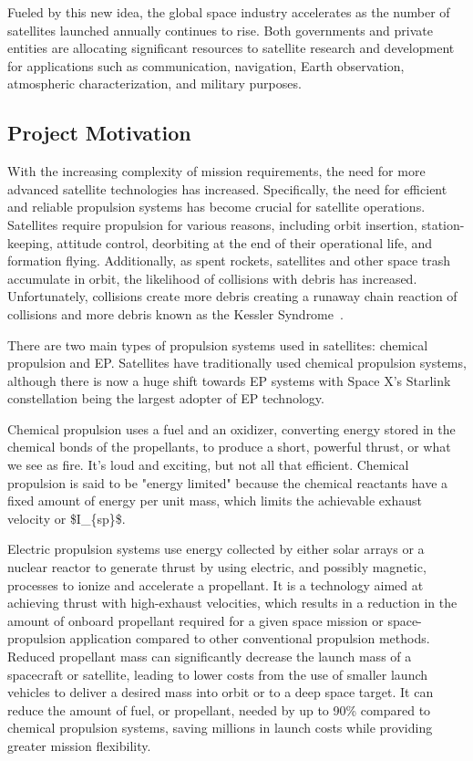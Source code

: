 Fueled by this new idea, the global space industry accelerates as the number of satellites launched annually continues to rise. Both governments and private entities are allocating significant resources to satellite research and development for applications such as communication, navigation, Earth observation, atmospheric characterization, and military purposes.

\subsection{Project Motivation}

With the increasing complexity of mission requirements, the need for more advanced satellite technologies has increased. Specifically, the need for efficient and reliable propulsion systems has become crucial for satellite operations. Satellites require propulsion for various reasons, including orbit insertion, station-keeping, attitude control, deorbiting at the end of their operational life, and formation flying. Additionally, as spent rockets, satellites and other space trash accumulate in orbit, the likelihood of collisions with debris has increased. Unfortunately, collisions create more debris creating a runaway chain reaction of collisions and more debris known as the Kessler Syndrome~\cite{nasa-kessler}.

There are two main types of propulsion systems used in satellites: chemical propulsion and \ac{EP}. Satellites have traditionally used chemical propulsion systems, although there is now a huge shift towards \ac{EP} systems with Space X's Starlink constellation being the largest adopter of EP technology.

Chemical propulsion uses a fuel and an oxidizer, converting energy stored in the chemical bonds of the propellants, to produce a short, powerful thrust, or what we see as fire. It’s loud and exciting, but not all that efficient. Chemical propulsion is said to be "energy limited" because the chemical reactants have a fixed amount of energy per unit mass, which limits the achievable exhaust velocity or \ac{$I_{sp}$}.

Electric propulsion systems use energy collected by either solar arrays or a nuclear reactor to generate thrust by using electric, and possibly magnetic, processes to ionize and accelerate a propellant. It is a technology aimed at achieving thrust with high-exhaust velocities, which results in a reduction in the amount of onboard propellant required for a given space mission or space-propulsion application compared to other conventional propulsion methods. Reduced propellant mass can significantly decrease the launch mass of a spacecraft or satellite, leading to lower costs from the use of smaller launch vehicles to deliver a desired mass into orbit or to a deep space target. \cite{fundamentals-of-electric-propulsion}
It can reduce the amount of fuel, or propellant, needed by up to 90\% compared to chemical propulsion systems, saving millions in launch costs while providing greater mission flexibility. \cite{nasa-electrifying-propulsion}

